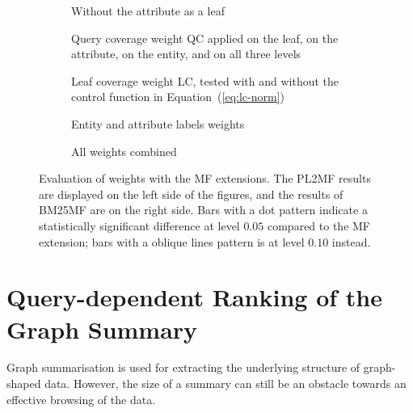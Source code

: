 \begin{figure}
	\centering
	\begin{subfigure}{.483\textwidth}
		\centering
		\resizebox{\textwidth}{!}{
			
		}
		\caption{Without the attribute as a leaf}
		\label{fig:mf-att}
	\end{subfigure}
	\quad
	\begin{subfigure}{.483\textwidth}
		\centering
		\resizebox{\textwidth}{!}{
			
		}
		\caption{Query coverage weight QC applied on the leaf, on the attribute, on the entity, and on all three levels}
		\label{fig:mf-qc}
	\end{subfigure}
	\qquad
	\begin{subfigure}{.483\textwidth}
		\centering
		\resizebox{\textwidth}{!}{
			
		}
		\caption{Leaf coverage weight LC, tested with and without the control function in Equation~(\ref{eq:lc-norm})}
		\label{fig:mf-lc}
	\end{subfigure}
	\quad
	\begin{subfigure}{.483\textwidth}
		\centering
		\resizebox{\textwidth}{!}{
			
		}
		\caption{Entity and attribute labels weights}
		\label{fig:mf-ael}
	\end{subfigure}
	\qquad
	\begin{subfigure}{.8\textwidth}
		\centering
		\resizebox{\textwidth}{!}{
			
		}
		\caption{All weights combined}
		\label{fig:mf-all}
	\end{subfigure}
	\caption[Evaluation of weights with the MF ranking extensions]{Evaluation of weights with the MF extensions. The PL2MF results are displayed on the left side of the figures, and the results of BM25MF are on the right side. Bars with a dot pattern indicate a statistically significant difference at level $0.05$ compared to the MF extension; bars with a oblique lines pattern is at level $0.10$ instead.}
	\label{fig:mf-weights}
\end{figure}

\section{Query-dependent Ranking of the Graph Summary}
\label{sec:summary-ranking}

Graph summarisation is used for extracting the underlying structure of graph-shaped data. However, the size of a summary can still be an obstacle towards an effective browsing of the data.

